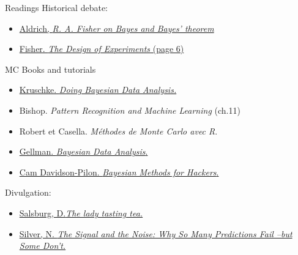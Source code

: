 \documentclass{beamer}
\begin{document}
\begin{frame}{Readings}
	Historical debate:
	\begin{itemize}
			\item \href{http://projecteuclid.org/download/pdf_1/euclid.ba/1340370565}{Aldrich, \textit{R. A. Fisher on Bayes and Bayes' theorem }}
			\item  \href{http://www.phil.vt.edu/dmayo/PhilStatistics/b\%20Fisher\%20design\%20of\%20experiments.pdf}{Fisher. \textit{The Design of Experiments} (page 6) }
	\end{itemize}
	MC Books and tutorials
	\begin{itemize}
		\item \href{http://www.indiana.edu/~kruschke/DoingBayesianDataAnalysis/}{Kruschke. \textit{Doing Bayesian Data Analysis.}}
		\item Bishop. \textit{Pattern Recognition and Machine Learning} (ch.11)
		\item Robert et Casella. \textit{Méthodes de Monte Carlo avec R}. 
		\item \href{http://www.stat.columbia.edu/~gelman/book/}{Gellman. \textit{Bayesian Data Analysis}.}
		\item \href{http://camdavidsonpilon.github.io/Probabilistic-Programming-and-Bayesian-Methods-for-Hackers/}{Cam Davidson-Pilon. \textit{Bayesian Methods for Hackers}.}
	\end{itemize}
	Divulgation:
	\begin{itemize}
		\item \href{https://en.wikipedia.org/wiki/The_Lady_Tasting_Tea}{Salsburg, D.\textit{The lady tasting tea.}}
		\item \href{https://en.wikipedia.org/wiki/The_Signal_and_the_Noise}{Silver, N. \textit{The Signal and the Noise: Why So Many Predictions Fail --but Some Don't.}}
	\end{itemize}
\end{frame}
\end{document}
